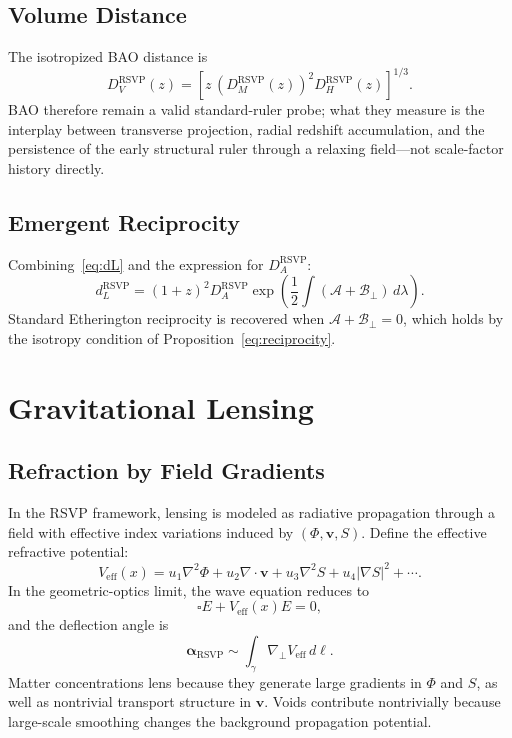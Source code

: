 \documentclass[12pt,a4paper]{article}
\theoremstyle{remark}
\newcommand{\vv}{\mathbf{v}}
\newcommand{\Acal}{\mathcal{A}}
\newcommand{\Bcal}{\mathcal{B}}
\newcommand{\dL}{d_L^{\mathrm{RSVP}}}
\newcommand{\DAr}{D_A^{\mathrm{RSVP}}}
\newcommand{\DHr}{D_H^{\mathrm{RSVP}}}
\newcommand{\DMr}{D_M^{\mathrm{RSVP}}}
\newcommand{\DVr}{D_V^{\mathrm{RSVP}}}
\begin{document}
\subsection{Volume Distance}

The isotropized BAO distance is
\begin{equation}
\DVr(z) = \left[z\,(\DMr(z))^2\DHr(z)\right]^{1/3}.
\end{equation}
BAO therefore remain a valid standard-ruler probe; what they measure is the interplay between transverse projection, radial redshift accumulation, and the persistence of the early structural ruler through a relaxing field---not scale-factor history directly.

\subsection{Emergent Reciprocity}

Combining~\eqref{eq:dL} and the expression for $\DAr$:
\begin{equation}
\dL = (1+z)^2\DAr \exp\!\left(\frac12\int(\Acal + \Bcal_\perp)\, d\lambda\right).
\end{equation}
Standard Etherington reciprocity is recovered when $\Acal + \Bcal_\perp = 0$, which holds by the isotropy condition of Proposition~\ref{eq:reciprocity}.

\section{Gravitational Lensing}
\label{sec:lensing}

\subsection{Refraction by Field Gradients}

In the RSVP framework, lensing is modeled as radiative propagation through a field with effective index variations induced by $(\Phi, \vv, S)$. Define the effective refractive potential:
\begin{equation}
V_{\mathrm{eff}}(x) = u_1 \nabla^2\Phi + u_2 \nabla\cdot\vv + u_3 \nabla^2 S + u_4 |\nabla S|^2 + \cdots.
\end{equation}
In the geometric-optics limit, the wave equation reduces to
\begin{equation}
\square E + V_{\mathrm{eff}}(x)E = 0,
\end{equation}
and the deflection angle is
\begin{equation}
\boldsymbol{\alpha}_{\mathrm{RSVP}} \sim \int_\gamma \nabla_\perp V_{\mathrm{eff}}\, d\ell.
\end{equation}
Matter concentrations lens because they generate large gradients in $\Phi$ and $S$, as well as nontrivial transport structure in $\vv$. Voids contribute nontrivially because large-scale smoothing changes the background propagation potential.
\end{document}
